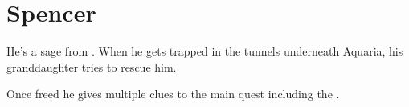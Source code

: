 \section{Spencer}
\label{char:spencer}


He’s a sage from . When he gets trapped in the tunnels underneath Aquaria, his granddaughter  tries to rescue him.

Once freed he gives multiple clues to the main quest including the .
